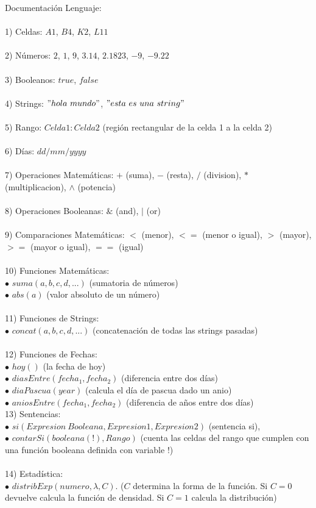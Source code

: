 \documentclass[10pt,a4paper]{report}
\begin{document}
 
Documentaci\'on Lenguaje: \\\\
1) Celdas: $A1$, $B4$, $K2$, $L11$ \\\\
2) N\'umeros: $2$, $1$, $9$, $3.14$, $2.1823$, $-9$, $-9.22$\\\\
3) Booleanos: $true$, $false$ \\\\
4) Strings: $"hola\ mundo"$, $"esta\ es\ una\ string"$ \\\\
5) Rango: $Celda1:Celda2$ (regi\'on rectangular de la celda 1 a la celda 2) \\\\
6) D\'ias: $dd/mm/yyyy$ \\\\
7) Operaciones Matem\'aticas: $+$ (suma), $-$ (resta), $/$ (division), $*$ (multiplicacion), $\wedge$ (potencia) \\\\
8) Operaciones Booleanas: $\&$ (and), $|$ (or) \\\\
9) Comparaciones Matem\'aticas: $<$ (menor), $<=$ (menor o igual), $>$ (mayor), $>=$ (mayor o igual), $==$ (igual) \\\\
10) Funciones Matem\'aticas: \\
 $\bullet$ $suma(a,b,c,d,...)$ (sumatoria de n\'umeros) \\
 $\bullet$ $abs(a)$ (valor absoluto de un n\'umero) \\\\
11) Funciones de Strings: \\
  $\bullet$ $concat(a,b,c,d,...)$ (concatenaci\'on de todas las strings pasadas) \\\\
12) Funciones de Fechas: \\
  $\bullet$ $hoy()$ (la fecha de hoy) \\
  $\bullet$ $diasEntre(fecha_1,fecha_2)$ (diferencia entre dos d\'ias) \\
  $\bullet$ $diaPascua(year)$ (calcula el d\'ia de pascua dado un anio) \\
  $\bullet$ $aniosEntre(fecha_1,fecha_2)$ (diferencia de a\~nos entre dos d\'ias) \\
13) Sentencias:\\ $\bullet$ $si(Expresion\ Booleana,Expresion1,Expresion2)$ (sentencia si), \\ $\bullet$ $contarSi(booleana(!),Rango)$ (cuenta las celdas del rango que cumplen con una funci\'on booleana definida con variable $!$) \\\\
14) Estad\'istica:\\ $\bullet$ $distribExp(numero,\lambda,C)$. ($C$ determina la forma de la funci\'on. Si $C = 0$ devuelve calcula la funci\'on de densidad. Si $C=1$ calcula la distribuci\'on)
\end{document}
